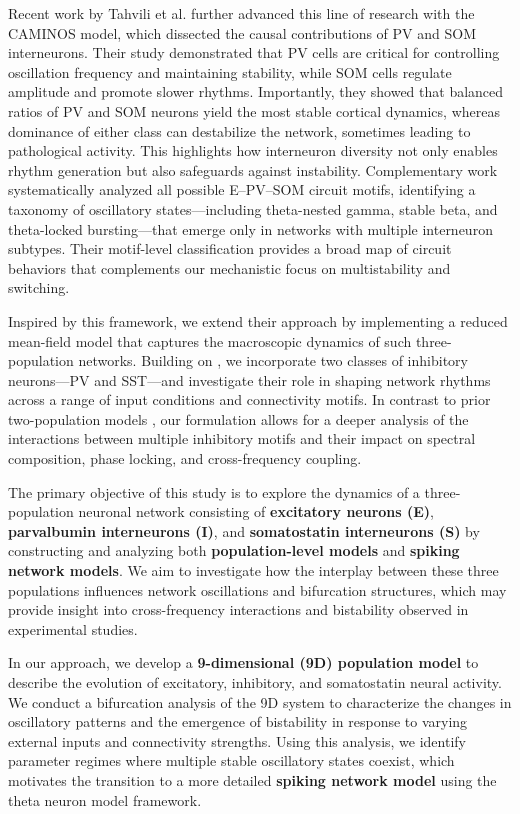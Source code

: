 \documentclass[10pt,letterpaper]{article}
\begin{document}
Recent work by Tahvili et al. \cite{FMM} further advanced this line of research with the CAMINOS model, which dissected the causal contributions of PV and SOM interneurons. Their study demonstrated that PV cells are critical for controlling oscillation frequency and maintaining stability, while SOM cells regulate amplitude and promote slower rhythms. Importantly, they showed that balanced ratios of PV and SOM neurons yield the most stable cortical dynamics, whereas dominance of either class can destabilize the network, sometimes leading to pathological activity. This highlights how interneuron diversity not only enables rhythm generation but also safeguards against instability. Complementary work \cite{terwal2021} systematically analyzed all possible E–PV–SOM circuit motifs, identifying a taxonomy of oscillatory states—including theta-nested gamma, stable beta, and theta-locked bursting—that emerge only in networks with multiple interneuron subtypes. Their motif-level classification provides a broad map of circuit behaviors that complements our mechanistic focus on multistability and switching.

Inspired by this framework, we extend their approach by implementing a reduced mean-field model that captures the macroscopic dynamics of such three-population networks. Building on \cite{montbrio}, we incorporate two classes of inhibitory neurons—PV and SST—and investigate their role in shaping network rhythms across a range of input conditions and connectivity motifs. In contrast to prior two-population models \cite{wc72, be79, borgers03}, our formulation allows for a deeper analysis of the interactions between multiple inhibitory motifs and their impact on spectral composition, phase locking, and cross-frequency coupling.

The primary objective of this study is to explore the dynamics of a three-population neuronal network consisting of \textbf{excitatory neurons (E)}, \textbf{parvalbumin interneurons (I)}, and \textbf{somatostatin interneurons (S)} by constructing and analyzing both \textbf{population-level models} and \textbf{spiking network models}. We aim to investigate how the interplay between these three populations influences network oscillations and bifurcation structures, which may provide insight into cross-frequency interactions and bistability observed in experimental studies.

In our approach, we develop a \textbf{9-dimensional (9D) population model} to describe the evolution of excitatory, inhibitory, and somatostatin neural activity. We conduct a bifurcation analysis of the 9D system to characterize the changes in oscillatory patterns and the emergence of bistability in response to varying external inputs and connectivity strengths. Using this analysis, we identify parameter regimes where multiple stable oscillatory states coexist, which motivates the transition to a more detailed \textbf{spiking network model} using the theta neuron model framework.
\end{document}
